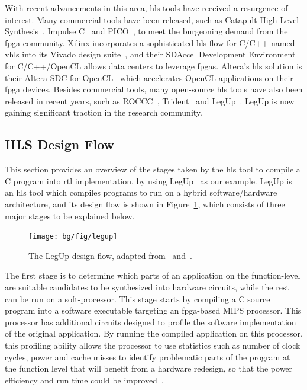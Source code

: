 With recent advancements in this area, \gls{hls} tools have received a
resurgence of interest.  Many commercial tools have been released, such as
Catapult High-Level Synthesis~\cite{catapultc}, Impulse C~\cite{impulsec} and
PICO~\cite{schreiber02}, to meet the burgeoning demand from the \gls{fpga}
community.  Xilinx incorporates a sophisticated \gls{hls} flow for C/C++
named \gls{vhls} into its Vivado design suite~\cite{vivado_ds}, and their
SDAccel Development Environment~\cite{sdaccel} for C/C++/OpenCL allows data
centers to leverage \glspl{fpga}.  Altera's \gls{hls} solution is their Altera
SDC for OpenCL~\cite{aoc} which accelerates OpenCL applications on their
\gls{fpga} devices.  Besides commercial tools, many open-source \gls{hls}
tools have also been released in recent years, such as ROCCC~\cite{roccc},
Trident~\cite{tripp05} and LegUp~\cite{legup}.  LegUp is now gaining
significant traction in the research community.


\subsection{HLS Design Flow}
\label{bg:sub:hls_design}

This section provides an overview of the stages taken by the \gls{hls}
tool to compile a C program into \gls{rtl} implementation, by using
LegUp~\cite{legup, canis13} as our example.  LegUp is an \gls{hls} tool which
compiles programs to run on a hybrid software/hardware architecture, and its
design flow is shown in Figure~\ref{bg:fig:legup}, which consists of three
major stages to be explained below.
\begin{figure}[ht]
    \centering
    \texttt{[image: bg/fig/legup]}
    \caption{%
        The LegUp design flow, adapted from~\cite{canis13} and~\cite{legup}.
    }\label{bg:fig:legup}
\end{figure}

The first stage is to determine which parts of an application on the
function-level are suitable candidates to be synthesized into hardware
circuits, while the rest can be run on a soft-processor.  This stage starts
by compiling a C source program into a software executable targeting an
\gls{fpga}-based MIPS processor.  This processor has additional circuits
designed to profile the software implementation of the original application.
By running the compiled application on this processor, this profiling ability
allows the processor to use statistics such as number of clock cycles, power
and cache misses to identify problematic parts of the program at the function
level that will benefit from a hardware redesign, so that the power efficiency
and run time could be improved~\cite{canis13}.

